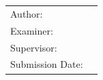 \begin{titlepage}
  \centering


  \vspace{5mm}
  {\huge\MakeUppercase{\getFaculty{}}}\\

  \vspace{5mm}
  {\large\MakeUppercase{\getUniversity{}}}\\

  \vspace{20mm}
  {\Large \getDoctype{}}

  \vspace{15mm}
  {\huge\bfseries \getTitle{}}

  \vspace{10mm}
  {\huge\bfseries \foreignlanguage{ngerman}{\getTitleGer{}}}

  \vspace{15mm}
  \begin{tabular}{l l}
    Author:          & \getAuthor{} \\
    Examiner:      & \getSupervisor{} \\
    Supervisor:         & \getAdvisor{} \\
    Submission Date: & \getSubmissionDate{} \\
  \end{tabular}

\end{titlepage}

